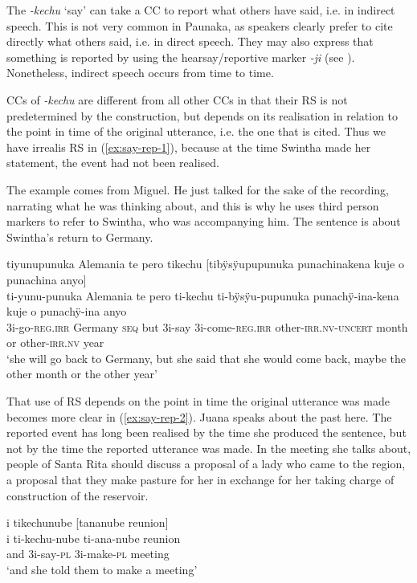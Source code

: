 The  \textit{-kechu} ‘say’ can take a CC to report what others have said, i.e. in indirect speech. This is not very common in Paunaka, as speakers clearly prefer to cite directly what others said, i.e. in direct speech. They may also express that something is reported by using the hearsay/reportive marker \textit{-ji} (see ). Nonetheless, indirect speech occurs from time to time. 

CCs of \textit{-kechu} are different from all other CCs in that their RS is not predetermined by the construction, but depends on its realisation in relation to the point in time of the original utterance, i.e. the one that is cited. Thus we have irrealis RS in (\ref{ex:say-rep-1}), because at the time Swintha made her statement, the event had not been realised.

The example comes from Miguel. He just talked for the sake of the recording, narrating what he was thinking about, and this is why he uses third person markers to refer to Swintha, who was accompanying him. The sentence is about Swintha’s return to Germany.

\ea\label{ex:say-rep-1}
\begingl
\glpreamble tiyunupunuka Alemania te pero tikechu \textup{[}tibÿsÿupupunuka punachinakena kuje o punachina anyo\textup{]}\\
\gla ti-yunu-punuka Alemania te pero ti-kechu ti-bÿsÿu-pupunuka punachÿ-ina-kena kuje o punachÿ-ina anyo\\
\glb 3i-go-\textsc{reg.irr} Germany \textsc{seq} but 3i-say 3i-come-\textsc{reg.irr} other-\textsc{irr.nv}-\textsc{uncert} month or other-\textsc{irr.nv} year\\
\glft ‘she will go back to Germany, but she said that she would come back, maybe the other month or the other year’
\endgl
\trailingcitation{[mxx-d110813s-2.049-050]}
\xe

That use of RS depends on the point in time the original utterance was made becomes more clear in (\ref{ex:say-rep-2}). Juana speaks about the past here. The reported event has long been realised by the time she produced the sentence, but not by the time the reported utterance was made. In the meeting she talks about, people of Santa Rita should discuss a proposal of a lady who came to the region, a proposal that they make pasture for her in exchange for her taking charge of construction of the reservoir.

\ea\label{ex:say-rep-2}
\begingl
\glpreamble i tikechunube \textup{[}tananube reunion\textup{]}\\
\gla i ti-kechu-nube ti-ana-nube reunion\\
\glb and 3i-say-\textsc{pl} 3i-make-\textsc{pl} meeting\\
\glft ‘and she told them to make a meeting’
\endgl
\trailingcitation{[jxx-p120515l-2.077]}
\xe

